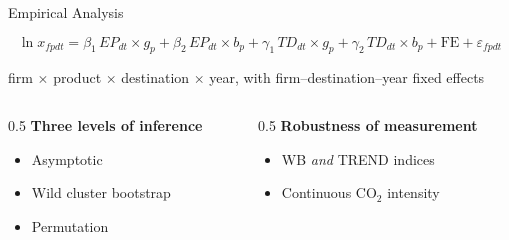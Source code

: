 \documentclass{beamer}
\begin{document}
\begin{frame}{Empirical Analysis}

  \begin{center}
  \[
  \ln x_{fpdt} = \beta_1\, EP_{dt}\!\times\!g_p + \beta_2\, EP_{dt}\!\times\!b_p
  + \gamma_1\, TD_{dt}\!\times\!g_p + \gamma_2\, TD_{dt}\!\times\!b_p
  + \text{FE} + \varepsilon_{fpdt}
  \]
  \end{center}

  \small
  \begin{center}
  firm $\times$ product $\times$ destination $\times$ year, with
  firm--destination--year fixed effects
  \end{center}
  \normalsize

  \vspace{1.2em}
  \begin{columns}[T]
    \begin{column}{0.5\textwidth}
      \textbf{\small Three levels of inference}
      \begin{itemize}\setlength\itemsep{4pt}
        \item Asymptotic
        \item Wild cluster bootstrap
        \item Permutation
      \end{itemize}
    \end{column}
    \begin{column}{0.5\textwidth}
      \textbf{\small Robustness of measurement}
      \begin{itemize}\setlength\itemsep{4pt}
        \item WB \emph{and} TREND indices
        \item Continuous CO$_2$ intensity
      \end{itemize}
    \end{column}
  \end{columns}

\end{frame}
\end{document}
